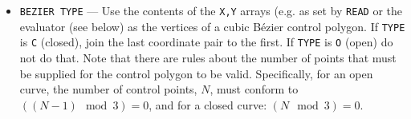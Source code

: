 \documentclass[a4paper,twoside,11pt]{article}
\newcommand{\textttc}[1]{\texttt{\textcolor{OurRed}{#1}}}
\begin{document}
\begin{itemize}
  last coordinate pair to the first. If \texttt{TYPE} is \texttt{O} (open) do not do that. The curve is calculated
  so that its first and second derivatives are continuous.
\item \textttc{BEZIER TYPE} --- Use the contents of the \texttt{X,Y} arrays (e.g. as set by \texttt{READ} or the
  evaluator (see below) as the vertices of a cubic B\'{e}zier control polygon.
  If \texttt{TYPE} is \texttt{C} (closed), join the last coordinate pair to the first. If \texttt{TYPE} is
  \texttt{O} (open) do not do that. Note that there are rules about the number of points that must be
  supplied for the control polygon to be valid. Specifically, for an open curve, the number of
  control points, $N$, must conform to $((N-1) \mod 3) = 0$, and for a closed curve: $(N \mod 3) = 0$.
\end{itemize}
\end{document}
